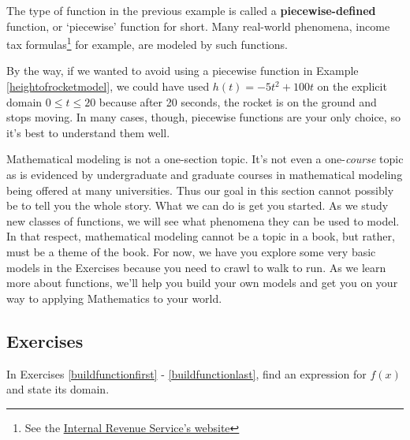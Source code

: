 The type of function in the previous example is called a \textbf{piecewise-defined} function, or `piecewise' function for short.  Many real-world phenomena, income tax formulas\footnote{See the \href{http://www.irs.gov/pub/irs-pdf/i1040tt.pdf}{\underline{Internal Revenue Service's website}} } for example, are modeled by such functions.  

\label{piecewisefunction}

\medskip

By the way, if we wanted to avoid using a piecewise function in Example \ref{heightofrocketmodel}, we could have used $h(t) = -5t^2 + 100t$ on the explicit domain $0 \leq t \leq 20$ because after 20 seconds, the rocket is on the ground and stops moving.  In many cases, though, piecewise functions are your only choice, so it's best to understand them well.

\medskip

Mathematical modeling is not a one-section topic.  It's not even a one-\emph{course} topic as is evidenced by undergraduate and graduate courses in mathematical modeling being offered at many universities.  Thus our goal in this section cannot possibly be to tell you the whole story.  What we can do is get you started.  As we study new classes of functions, we will see what phenomena they can be used to model.  In that respect, mathematical modeling cannot be a topic in a book, but rather, must be a theme of the book.  For now, we have you explore some very basic models in the Exercises because you need to crawl to walk to run.  As we learn more about functions, we'll help you build your own models and get you on your way to applying Mathematics to your world.


\newpage

\subsection{Exercises}

In Exercises \ref{buildfunctionfirst} - \ref{buildfunctionlast}, find an expression for $f(x)$ and state its domain.


